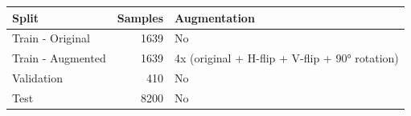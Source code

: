 \begin{tabular}{lrl}
\toprule
Split & Samples & Augmentation \\
\midrule
Train - Original & 1639 & No \\
Train - Augmented & 1639 & 4x (original + H-flip + V-flip + 90° rotation) \\
Validation & 410 & No \\
Test & 8200 & No \\
\bottomrule
\end{tabular}
